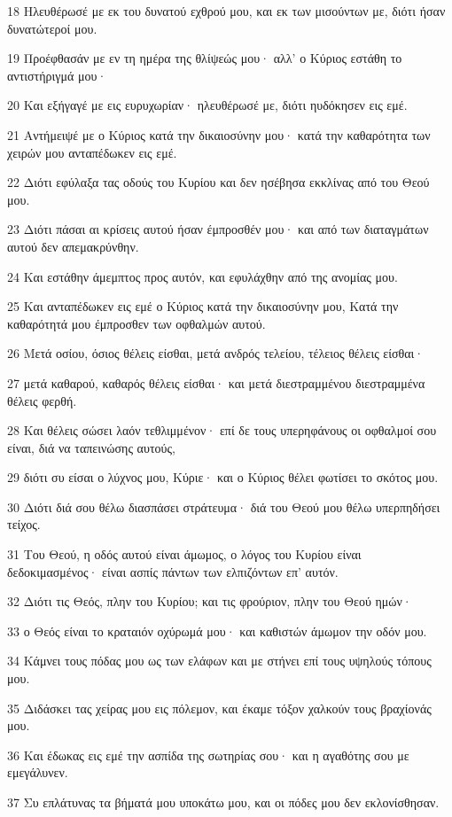 \par 18 Ηλευθέρωσέ με εκ του δυνατού εχθρού μου, και εκ των μισούντων με, διότι ήσαν δυνατώτεροί μου.
\par 19 Προέφθασάν με εν τη ημέρα της θλίψεώς μου· αλλ' ο Κύριος εστάθη το αντιστήριγμά μου·
\par 20 Και εξήγαγέ με εις ευρυχωρίαν· ηλευθέρωσέ με, διότι ηυδόκησεν εις εμέ.
\par 21 Αντήμειψέ με ο Κύριος κατά την δικαιοσύνην μου· κατά την καθαρότητα των χειρών μου ανταπέδωκεν εις εμέ.
\par 22 Διότι εφύλαξα τας οδούς του Κυρίου και δεν ησέβησα εκκλίνας από του Θεού μου.
\par 23 Διότι πάσαι αι κρίσεις αυτού ήσαν έμπροσθέν μου· και από των διαταγμάτων αυτού δεν απεμακρύνθην.
\par 24 Και εστάθην άμεμπτος προς αυτόν, και εφυλάχθην από της ανομίας μου.
\par 25 Και ανταπέδωκεν εις εμέ ο Κύριος κατά την δικαιοσύνην μου, Κατά την καθαρότητά μου έμπροσθεν των οφθαλμών αυτού.
\par 26 Μετά οσίου, όσιος θέλεις είσθαι, μετά ανδρός τελείου, τέλειος θέλεις είσθαι·
\par 27 μετά καθαρού, καθαρός θέλεις είσθαι· και μετά διεστραμμένου διεστραμμένα θέλεις φερθή.
\par 28 Και θέλεις σώσει λαόν τεθλιμμένον· επί δε τους υπερηφάνους οι οφθαλμοί σου είναι, διά να ταπεινώσης αυτούς,
\par 29 διότι συ είσαι ο λύχνος μου, Κύριε· και ο Κύριος θέλει φωτίσει το σκότος μου.
\par 30 Διότι διά σου θέλω διασπάσει στράτευμα· διά του Θεού μου θέλω υπερπηδήσει τείχος.
\par 31 Του Θεού, η οδός αυτού είναι άμωμος, ο λόγος του Κυρίου είναι δεδοκιμασμένος· είναι ασπίς πάντων των ελπιζόντων επ' αυτόν.
\par 32 Διότι τις Θεός, πλην του Κυρίου; και τις φρούριον, πλην του Θεού ημών·
\par 33 ο Θεός είναι το κραταιόν οχύρωμά μου· και καθιστών άμωμον την οδόν μου.
\par 34 Κάμνει τους πόδας μου ως των ελάφων και με στήνει επί τους υψηλούς τόπους μου.
\par 35 Διδάσκει τας χείρας μου εις πόλεμον, και έκαμε τόξον χαλκούν τους βραχίονάς μου.
\par 36 Και έδωκας εις εμέ την ασπίδα της σωτηρίας σου· και η αγαθότης σου με εμεγάλυνεν.
\par 37 Συ επλάτυνας τα βήματά μου υποκάτω μου, και οι πόδες μου δεν εκλονίσθησαν.
